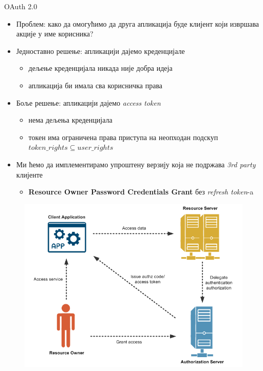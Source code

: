 \documentclass[aspectratio=169]{beamer}
\begin{document}
    \begin{frame}[allowframebreaks]{OAuth 2.0}
        \begin{itemize}
            \item Проблем: како да омогућимо да друга апликација буде клијент који извршава акције у име корисника?
            \item Једноставно решење: апликацији дајемо креденцијале
            \begin{itemize}
                \item дељење креденцијала никада није добра идеја
                \item апликација би имала сва корисничка права
            \end{itemize}
            \item Боље решење: апликацији дајемо \textit{access token}
            \begin{itemize}
                \item нема дељења креденцијала
                \item токен има ограничена права приступа на неопходан подскуп \begin{math}token\_rights \subseteq user\_rights\end{math}
            \end{itemize}
            \item Ми ћемо да имплементирамо упроштену верзију која не подржава \textit{3rd party} клијенте
            \begin{itemize}
                \item \textbf{Resource Owner Password Credentials Grant} без \textit{refresh token}-a
            \end{itemize}
        \end{itemize}
        
        \framebreak
        
        \begin{figure}
            \centering
            \includegraphics[width=\textwidth,height=0.8\textheight,keepaspectratio]{images/oauth_overview.png}
            \label{fig:oauth_overview}
        \end{figure}
        

\end{frame}
\end{document}
